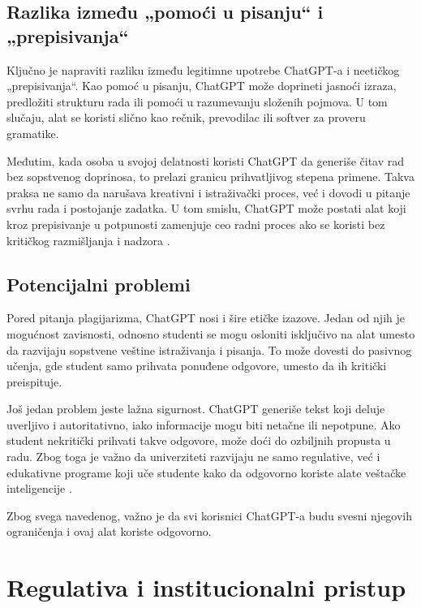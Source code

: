 \documentclass[12pt]{article}
\begin{document}
\subsection{Razlika između „pomoći u pisanju“ i „prepisivanja“}

Ključno je napraviti razliku između legitimne upotrebe ChatGPT-a i neetičkog „prepisivanja“. Kao pomoć u pisanju, ChatGPT može doprineti jasnoći izraza, predložiti strukturu rada ili pomoći u razumevanju složenih pojmova. U tom slučaju, alat se koristi slično kao rečnik, prevodilac ili softver za proveru gramatike.

Međutim, kada osoba u svojoj delatnosti koristi ChatGPT da generiše čitav rad bez sopstvenog doprinosa, to prelazi granicu prihvatljivog stepena primene. Takva praksa ne samo da narušava kreativni i istraživački proces, već i dovodi u pitanje svrhu rada i postojanje zadatka. U tom smislu, ChatGPT može postati alat koji kroz prepisivanje u potpunosti zamenjuje ceo radni proces ako se koristi bez kritičkog razmišljanja i nadzora \cite{zakova2025exploring}.


\subsection{Potencijalni problemi}

Pored pitanja plagijarizma, ChatGPT nosi i šire etičke izazove. Jedan od njih je mogućnost zavisnosti, odnosno studenti se mogu osloniti isključivo na alat umesto da razvijaju sopstvene veštine istraživanja i pisanja. To može dovesti do pasivnog učenja, gde student samo prihvata ponuđene odgovore, umesto da ih kritički preispituje\cite{edwards2023chatgpt}.

Još jedan problem jeste lažna sigurnost. ChatGPT generiše tekst koji deluje uverljivo i autoritativno, iako informacije mogu biti netačne ili nepotpune. Ako student nekritički prihvati takve odgovore, može doći do ozbiljnih propusta u radu. Zbog toga je važno da univerziteti razvijaju ne samo regulative, već i edukativne programe koji uče studente kako da odgovorno koriste alate veštačke inteligencije \cite{zakova2025exploring}.

Zbog svega navedenog, važno je da svi korisnici ChatGPT-a budu svesni njegovih ograničenja i ovaj alat koriste odgovorno.

\section{Regulativa i institucionalni pristup}
\end{document}
